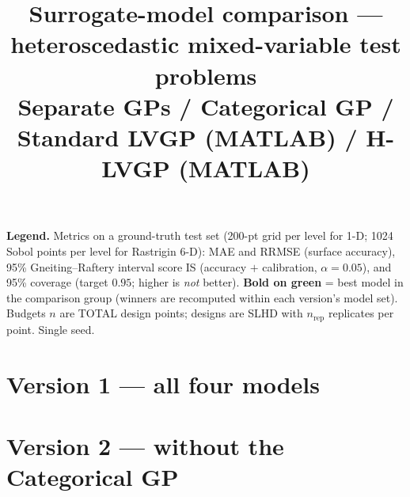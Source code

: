 \documentclass[11pt]{article}
\title{Surrogate-model comparison --- heteroscedastic mixed-variable test problems\\
\large Separate GPs / Categorical GP / Standard LVGP (MATLAB) / H-LVGP (MATLAB)}
\author{}
\date{}
\begin{document}
\maketitle
\noindent\textbf{Legend.} Metrics on a ground-truth test set (200-pt grid per level for 1-D;
1024 Sobol points per level for Rastrigin 6-D): MAE and RRMSE (surface accuracy), 95\%
Gneiting--Raftery interval score IS (accuracy $+$ calibration, $\alpha=0.05$), and 95\% coverage
(target $0.95$; higher is \emph{not} better). \colorbox{green!20}{\textbf{Bold on green}} = best model
in the comparison group (winners are recomputed within each version's model set). Budgets $n$
are TOTAL design points; designs are SLHD with $n_{\mathrm{rep}}$ replicates per point.
Single seed.
\vspace{1em}

\section*{Version 1 --- all four models}

\clearpage

\clearpage

\clearpage

\clearpage

\clearpage

\clearpage

\clearpage

\clearpage

\clearpage

\clearpage

\clearpage
\clearpage
\section*{Version 2 --- without the Categorical GP}

\clearpage

\clearpage

\clearpage

\clearpage

\clearpage

\clearpage
\end{document}
